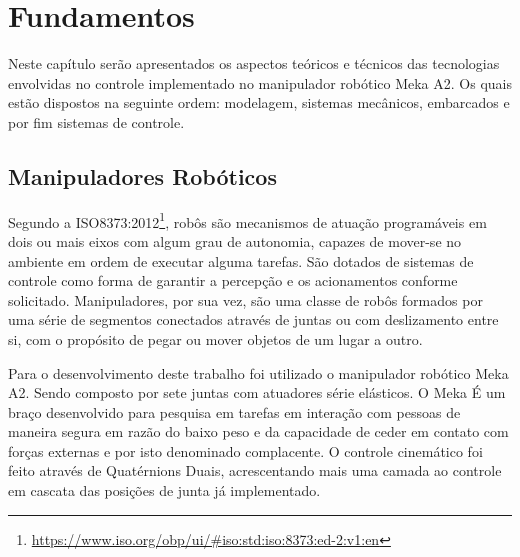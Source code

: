 \chapter{Fundamentos}\label{ch:teory-reference}





\vspace{0.5cm}
Neste capítulo serão apresentados os aspectos teóricos e técnicos das tecnologias envolvidas no controle implementado no manipulador robótico Meka A2. Os quais estão dispostos na seguinte ordem: modelagem, sistemas mecânicos, embarcados e por fim sistemas de controle.

\section{Manipuladores Robóticos}

Segundo a ISO8373:2012\footnote{\url{https://www.iso.org/obp/ui/#iso:std:iso:8373:ed-2:v1:en}}, robôs são mecanismos de atuação programáveis em dois ou mais eixos com algum grau de autonomia, capazes de mover-se no ambiente em ordem de executar alguma tarefas. São dotados de sistemas de controle como forma de garantir a percepção e os acionamentos conforme solicitado. Manipuladores, por sua vez, são uma classe de robôs formados por uma série de segmentos conectados através de juntas ou com deslizamento entre si, com o propósito de pegar ou mover objetos de um lugar a outro.

Para o desenvolvimento deste trabalho foi utilizado o manipulador robótico Meka A2. Sendo composto por sete juntas com atuadores série elásticos. O Meka É um braço desenvolvido para pesquisa em tarefas em interação com pessoas de maneira segura em razão do baixo peso e da capacidade de ceder em contato com forças externas e por isto denominado complacente. O controle cinemático foi feito através de Quatérnions Duais, acrescentando mais uma camada ao controle em cascata das posições de junta já implementado.

